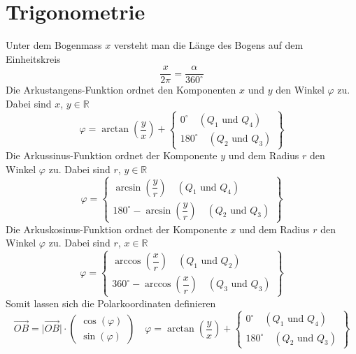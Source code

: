 \section{Trigonometrie}
Unter dem Bogenmass $x$ versteht man die Länge des Bogens auf dem Einheitskreis
\begin{equation}
\boxed{\dfrac{x}{2\pi}=\dfrac{\alpha}{360^{\circ}}}
\end{equation}
Die Arkustangens-Funktion ordnet den Komponenten $x$ und $y$ den Winkel $\varphi$ zu. Dabei sind $x$, $y\in \mathbb{R}$
\begin{equation}
\boxed{\varphi=\arctan\left(\dfrac{y}{x}\right)+\left\{\begin{matrix}0^{\circ}\quad (Q_1\text{ und }Q_4)\\180^{\circ}\quad (Q_2\text{ und }Q_3)\end{matrix}\right\}}
\end{equation}
Die Arkussinus-Funktion ordnet der Komponente $y$ und dem Radius $r$ den Winkel $\varphi$ zu. Dabei sind $r$, $y\in \mathbb{R}$
\begin{equation}
\boxed{\varphi=\left\{\begin{matrix}\arcsin\left(\dfrac{y}{r}\right)\quad (Q_1\text{ und }Q_4)\\180^{\circ}-\arcsin\left(\dfrac{y}{r}\right)\quad (Q_2\text{ und }Q_3)\end{matrix}\right\}}
\end{equation}
Die Arkuskosinus-Funktion ordnet der Komponente $x$ und dem Radius $r$ den Winkel $\varphi$ zu. Dabei sind $r$, $x\in \mathbb{R}$
\begin{equation}
\boxed{\varphi=\left\{\begin{matrix}\arccos\left(\dfrac{x}{r}\right)\quad (Q_1\text{ und }Q_2)\\360^{\circ}-\arccos\left(\dfrac{x}{r}\right)\quad (Q_3\text{ und }Q_3)\end{matrix}\right\}}
\end{equation}
Somit lassen sich die Polarkoordinaten definieren
\begin{equation}
\boxed{\overrightarrow{OB}=\Big\vert\overrightarrow{OB}\Big\vert\cdot \begin{pmatrix}\cos\left(\varphi\right)\\\sin\left(\varphi\right)\end{pmatrix}}\quad \boxed{\varphi=\arctan\left(\dfrac{y}{x}\right)+\left\{\begin{matrix}0^{\circ}\quad (Q_1\text{ und }Q_4)\\180^{\circ}\quad (Q_2\text{ und }Q_3)\end{matrix}\right\}}
\end{equation}

